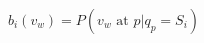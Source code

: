 \documentclass[12pt]{article}
\begin{document}
\begin{equation}
    \nonumber b_i(v_w) = P(v_w \text{ at } p | q_p = S_i)
\end{equation}
\end{document}
